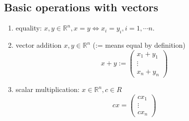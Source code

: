 \documentclass{article}
\theoremstyle{definition}
\theoremstyle{thrm}
\begin{document}
\subsection{Basic operations with vectors}
\begin{enumerate}
	\item equality: $x,y \in \mathbb{R}^n, x=y \Longleftrightarrow x_i = y_i, i = 1,\cdots n $.
	\item vector addition $x,y \in \mathbb{R}^n$ (:= means equal by definition)
	\begin{equation*}
		x+y:=
		\begin{pmatrix}
			x_1+y_1\\
			\vdots \\
			x_n+y_n
		\end{pmatrix}
	\end{equation*}
	\item scalar multiplication: $x \in \mathbb{R}^n, c\in R $
	\begin{equation*}
		cx =  
		\begin{pmatrix}
			cx_1\\
			\vdots \\
			cx_n
		\end{pmatrix}
	\end{equation*}
\end{enumerate}
\end{document}
